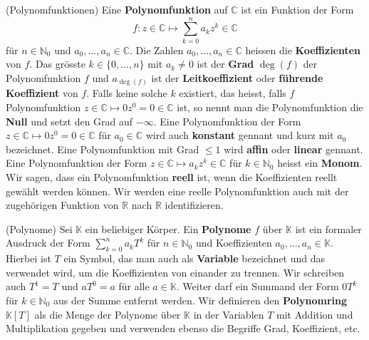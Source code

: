 \documentclass[../Analysis1_script.tex]{subfiles}
\begin{document}
\begin{definition}{(Polynomfunktionen)}
	Eine \textbf{Polynomfunktion} auf $\mathbb{C}$ ist ein Funktion der Form
	\[f : z \in \mathbb{C} \mapsto \sum_{k=0}^n a_k z^k \in \mathbb{C}\]
	für $n \in \mathbb{N}_0$ und $a_0, \ldots, a_n \in \mathbb{C}$. Die Zahlen $a_0, \ldots, a_n \in \mathbb{C}$ heissen die \textbf{Koeffizienten} von $f$. Das grösste $k \in \{0, \ldots, n\}$ mit $a_k \neq 0$ ist der \textbf{Grad} $\deg(f)$ der Polynomfunktion $f$ und $a_{\deg(f)}$ ist der \textbf{Leitkoeffizient} oder \textbf{führende Koeffizient} von $f$. Falls keine solche $k$ existiert, das heisst, falls $f$ Polynomfunktion $z \in \mathbb{C} \mapsto 0z^0 = 0 \in \mathbb{C}$ ist, so nennt man die Polynomfunktion die \textbf{Null} und setzt den Grad auf $-\infty$. Eine Polynomfunktion der Form $z \in \mathbb{C} \mapsto 0z^0 = 0 \in \mathbb{C}$ für $a_0 \in \mathbb{C}$ wird auch \textbf{konstant} gennant und kurz mit $a_0$ bezeichnet. Eine Polynomfunktion mit Grad $\leq 1$ wird \textbf{affin} oder \textbf{linear} gennant. Eine Polynomfunktion der Form $z \in \mathbb{C} \mapsto a_k z^k \in \mathbb{C}$ für $k \in \mathbb{N}_0$ heisst ein \textbf{Monom}. Wir sagen, dass ein Polynomfunktion \textbf{reell} ist, wenn die Koeffizienten reellt gewählt werden können. Wir werden eine reelle Polynomfunktion auch mit der zugehörigen Funktion von $\mathbb {R}$ nach $\mathbb {R}$ identifizieren. 
\end{definition}

\begin{definition}{(Polynome)}
	Sei $\mathbb{K}$ ein beliebiger Körper. Ein \textbf{Polynome} $f$ über $\mathbb{K}$ ist ein formaler Ausdruck der Form $\sum_{k=0}^n a_k T^k$ für $n \in \mathbb{N}_0$ und Koeffizienten $a_0, \ldots, a_n \in \mathbb{K}$. Hierbei ist $T$ ein Symbol, das man auch als \textbf{Variable} bezeichnet und das verwendet wird, um die Koeffizienten von einander zu trennen. Wir schreiben auch $T^1 = T$ und $aT^0 = a$ für alle $a \in \mathbb{K}$. Weiter darf ein Summand der Form $0T^k$ für $k\in \mathbb {N}_0$ aus der Summe entfernt werden. Wir definieren den \textbf{Polynomring} $\mathbb{K}[T]$ als die Menge der Polynome über $\mathbb {K}$ in der Variablen $T$ mit Addition und Multiplikation gegeben und verwenden ebenso die Begriffe Grad, Koeffizient, etc.
\end{definition}
\end{document}
